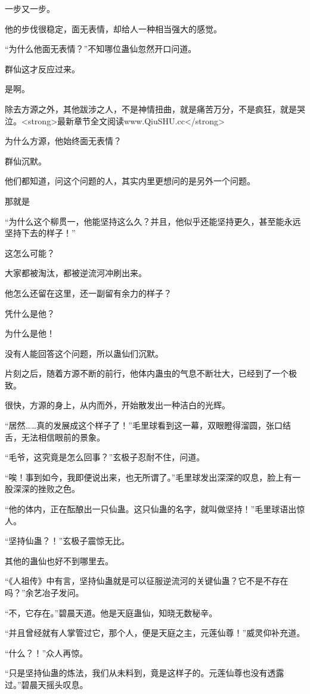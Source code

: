 \begin{this_body}
一步又一步。

他的步伐很稳定，面无表情，却给人一种相当强大的感觉。

“为什么他面无表情？”不知哪位蛊仙忽然开口问道。

群仙这才反应过来。

是啊。

除去方源之外，其他跋涉之人，不是神情扭曲，就是痛苦万分，不是疯狂，就是哭泣。<strong>最新章节全文阅读www.QiuSHU.cc</strong>

为什么方源，他始终面无表情？

群仙沉默。

他们都知道，问这个问题的人，其实内里更想问的是另外一个问题。

那就是

“为什么这个柳贯一，他能坚持这么久？并且，他似乎还能坚持更久，甚至能永远坚持下去的样子！”

这怎么可能？

大家都被淘汰，都被逆流河冲刷出来。

他怎么还留在这里，还一副留有余力的样子？

凭什么是他？

为什么是他！

没有人能回答这个问题，所以蛊仙们沉默。

片刻之后，随着方源不断的前行，他体内蛊虫的气息不断壮大，已经到了一个极致。

很快，方源的身上，从内而外，开始散发出一种洁白的光辉。

“居然……真的发展成这个样子了！”毛里球看到这一幕，双眼瞪得溜圆，张口结舌，无法相信眼前的景象。

“毛爷，这究竟是怎么回事？”玄极子忍耐不住，问道。

“唉！事到如今，我即便说出来，也无所谓了。”毛里球发出深深的叹息，脸上有一股深深的挫败之色。

“他的体内，正在酝酿出一只仙蛊。这只仙蛊的名字，就叫做坚持！”毛里球语出惊人。

“坚持仙蛊？！”玄极子震惊无比。

其他的蛊仙也好不到哪里去。

“《人祖传》中有言，坚持仙蛊就是可以征服逆流河的关键仙蛊？它不是不存在吗？”余艺冶子发问。

“不，它存在。”碧晨天道。他是天庭蛊仙，知晓无数秘辛。

“并且曾经就有人掌管过它，那个人，便是天庭之主，元莲仙尊！”威灵仰补充道。

“什么？！”众人再惊。

“只是坚持仙蛊的炼法，我们从未料到，竟是这样子的。元莲仙尊也没有透露过。”碧晨天摇头叹息。


\end{this_body}
